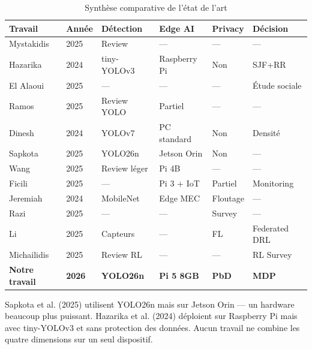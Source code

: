 \begin{table}[H]
\centering
\footnotesize
\renewcommand{\arraystretch}{1.12}
\caption{Synthèse comparative de l'état
         de l'art}
\label{tab:synthese}
\begin{tabularx}{\textwidth}
  {p{2.4cm}p{1.15cm}XXXX}
\toprule
\textbf{Travail} &
\textbf{Année} &
\textbf{Détection} &
\textbf{Edge AI} &
\textbf{Privacy} &
\textbf{Décision} \\
\midrule
Mystakidis & 2025 &
Review & — & — & — \\
Hazarika & 2024 &
tiny-YOLOv3 & Raspberry Pi &
Non & SJF+RR \\
El Alaoui & 2025 &
— & — & — &
Étude sociale \\
Ramos & 2025 &
Review YOLO & Partiel & — & — \\
Dinesh & 2024 &
YOLOv7 & PC standard &
Non & Densité \\
Sapkota & 2025 &
YOLO26n & Jetson Orin &
Non & — \\
Wang & 2025 &
Review léger & Pi 4B & — & — \\
Ficili & 2025 &
— & Pi 3 + IoT &
Partiel & Monitoring \\
Jeremiah & 2024 &
MobileNet & Edge MEC &
Floutage & — \\
Razi & 2025 &
— & — & Survey & — \\
Li & 2025 &
Capteurs & — & FL &
Federated DRL \\
Michailidis & 2025 &
Review RL & — & — &
RL Survey \\
\midrule
\rowcolor{PrimaryBlue!15}
\textbf{Notre travail} &
\textbf{2026} &
\textbf{YOLO26n} &
\textbf{Pi 5 8GB} &
\textbf{PbD} &
\textbf{MDP} \\
\bottomrule
\end{tabularx}
\end{table}

Sapkota et al. (2025) utilisent YOLO26n
mais sur Jetson Orin — un hardware beaucoup
plus puissant. Hazarika et al. (2024)
déploient sur Raspberry Pi mais avec
tiny-YOLOv3 et sans protection des données.
Aucun travail ne combine les quatre
dimensions sur un seul dispositif.

